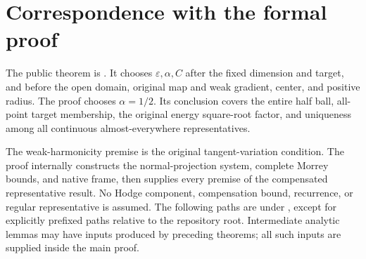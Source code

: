 \documentclass[reqno,11pt]{amsart}
\numberwithin{equation}{section}
\theoremstyle{definition}
\theoremstyle{remark}
\begin{document}
\section{Correspondence with the formal proof}\label{sec:formal}
The public theorem is
.
It chooses $\varepsilon,\alpha,C$ after the fixed dimension and target,
and before the open domain, original map and weak gradient, center,
and positive radius. The proof chooses $\alpha=1/2$. Its conclusion
covers the entire half ball, all-point target membership, the original
energy square-root factor, and uniqueness among all continuous
almost-everywhere representatives.

The weak-harmonicity premise is the original tangent-variation
condition. The proof internally constructs the normal-projection
system, complete Morrey bounds, and native frame, then supplies every
premise of the compensated representative result. No Hodge component,
compensation bound, recurrence, or regular representative is assumed.
The following paths are under , except
for explicitly prefixed  paths relative to the repository
root. Intermediate analytic lemmas may have
inputs produced by preceding theorems; all such inputs are supplied
inside the main proof.
\end{document}
